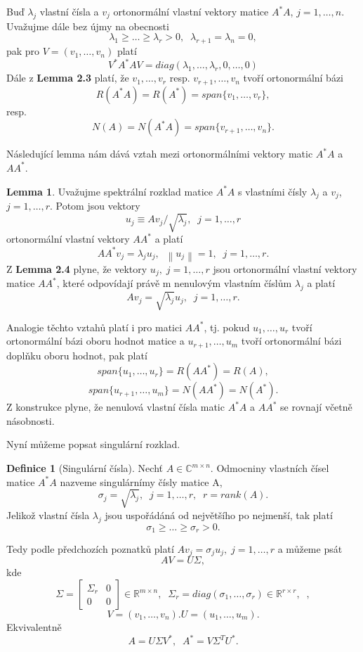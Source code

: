 \documentclass{article}
\theoremstyle{plain}
\theoremstyle{definition}
\newtheorem{definice}[veta]{Definice}
\newtheorem{lemma}[veta]{Lemma}
\begin{document}
Buď $\lambda_j$ vlastní čísla a $v_j$ ortonormální vlastní vektory matice $A^*A$, $j=1,\hdots,n.$ Uvažujme dále bez újmy na obecnosti 
$$\lambda_1 \geq \hdots \geq \lambda_r > 0,\;\; \lambda_{r+1}=\lambda_n=0,$$
pak pro $V=(v_1,\hdots,v_n)$ platí 
$$V^*A^*AV=diag(\lambda_1,\hdots,\lambda_r,0,\hdots,0)$$
Dále z \textbf{Lemma 2.3} platí, že $v_1,\hdots,v_r$ resp. $v_{r+1},\hdots,v_n$ tvoří ortonormální bázi
$$R(A^*A)=R(A^*)=span\{v_1,\hdots,v_r\},$$resp. $$N(A)=N(A^*A)=span\{v_{r+1},\hdots,v_n\}.$$

Následující lemma nám dává vztah mezi ortonormálními vektory matic $A^*A$ a $AA^*$.
\begin{lemma}
Uvažujme spektrální rozklad matice $A^*A$ s vlastními čísly $\lambda_j$ a $v_j$, $j=1,\hdots,r.$ Potom jsou vektory
$$u_j \equiv Av_j/\sqrt{\lambda_j},\;\;j=1,\hdots,r$$
ortonormální vlastní vektory $AA^*$ a platí
$$AA^*v_j=\lambda_j u_j,\;\; \left \lVert u_j \right \rVert = 1,\;\; j=1,\hdots,r. $$
Z \textbf{Lemma 2.4} plyne, že vektory $u_j,\;j=1,\hdots,r$ jsou ortonormální vlastní vektory matice $AA^*$, které odpovídají právě m nenulovým vlastním číslům $\lambda_j$ a platí 
$$Av_j=\sqrt{\lambda_j}u_j,\;\;j=1,\hdots,r.$$

Analogie těchto vztahů platí i pro matici $AA^*$, tj. pokud $u_1,\hdots,u_r$ tvoří ortonormální bázi oboru hodnot matice a $u_{r+1},\hdots,u_m$ tvoří ortonormální bázi doplňku oboru hodnot, pak platí
$$span\{u_1,\hdots,u_r\}=R(AA^*)=R(A),$$
$$span\{u_{r+1},\hdots,u_m\}=N(AA^*)=N(A^*).$$
Z konstrukce plyne, že nenulová vlastní čísla matic $A^*A$ a $AA^*$ se rovnají včetně násobnosti.    
\end{lemma}

Nyní můžeme popsat singulární rozklad.
\begin{definice}[Singulární čísla]
Nechť $A\in\mathbb{C}^{m\times n}$. Odmocniny vlastních čísel matice $A^*A$ nazveme singulárnímy čísly matice A,
$$\sigma_j=\sqrt{\lambda_j}, \;\;j=1,\hdots,r,\;\;r=rank(A).$$
Jelikož vlastní čísla $\lambda_j$ jsou uspořádáná od největšího po nejmenší, tak platí
$$\sigma_1\geq\hdots\geq\sigma_r>0.$$ 
\end{definice}
Tedy podle předchozích poznatků platí $Av_j=\sigma_ju_j,\;j=1,\hdots,r$ a můžeme psát
$$AV=U\Sigma,$$
kde $$\Sigma=
    \begin{bmatrix}
    \Sigma_r & 0 \\
    0 & 0
    \end{bmatrix} \in \mathbb{R}^{m \times n},\;\; \Sigma_r=diag(\sigma_1,\hdots,\sigma_r)\in\mathbb{R}^{r\times r},\;\;,$$
    $$V=(v_1,\hdots,v_n). U=(u_1,\hdots,u_m).$$
Ekvivalentně
$$A=U\Sigma V^*,\;\;A^*=V\Sigma^TU^*.$$
\end{document}
